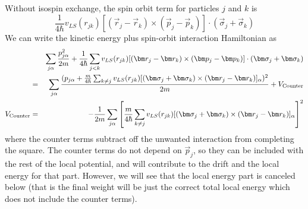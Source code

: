  Without isospin exchange, the spin orbit term for particles $j$ and $k$
 is
 \begin{equation}
 \frac{1}{4\hbar}
 v_{LS}(r_{jk}) [(\vec r_j-\vec r_k) \times (\vec p_j-\vec p_k)
 ]\cdot ( \vec\sigma_j+\vec \sigma_k )
 \end{equation}
 We can write the kinetic energy plus spin-orbit interaction Hamiltonian
 as
 \begin{eqnarray}
 && \sum_{j\alpha} \frac{p^2_{j\alpha}}{2m} +
 \frac{1}{4\hbar}\sum_{j<k}
 v_{LS}(r_{jk}) [(\vec r_j-\vec r_k) \times (\vec p_j-\vec p_k)
 ]\cdot ( \vec\sigma_j+\vec \sigma_k )
 \nonumber\\
 &=& \sum_{j\alpha} \frac{(p_{j\alpha}+\frac{m}{4\hbar}\sum_{k\neq j}
 	v_{LS}(r_{jk})
 	[(\vec \sigma_j+\vec \sigma_k) \times (\vec r_j-\vec r_k)]_\alpha)^2}{2m}
 +V_{\rm Counter}
 \nonumber\\
 V_{\rm Counter} &=& -\frac{1}{2m} \sum_{j\alpha} \left [
 \frac{m}{4\hbar}\sum_{k\neq j}
 v_{LS}(r_{jk})
 [(\vec \sigma_j+\vec \sigma_k) \times (\vec r_j-\vec r_k)]_\alpha \right ]^2
 \end{eqnarray}
 where the counter terms subtract off the unwanted interaction from
 completing the square.
 The counter terms do not depend on $\vec p_j$, so they can be included
 with the rest of the local potential, and will contribute to the
 drift and the local energy for that part. However, we will see that the local
 energy part is canceled below (that is the final weight will be just the
 correct total local energy which does not include the counter terms).
 
